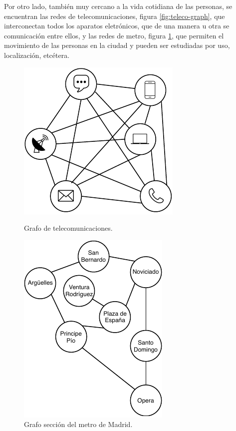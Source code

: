 Por otro lado, también muy cercano a la vida cotidiana de las personas, se encuentran las redes de telecomunicaciones, figura \ref{fig:teleco-graph}, que interconectan todos los aparatos eletrónicos, que de una manera u otra se comunicación entre ellos, y las redes de metro, figura \ref{fig:metro-graph}, que permiten el movimiento de las personas en la ciudad y pueden ser estudiadas por uso, localización, etcétera.

\begin{figure}[H]
	\begin{minipage}[b]{0.5\linewidth}
			\centering
			\includegraphics{Figures/teleco-graph.pdf}
			\caption{Grafo de telecomunicaciones.}
			\label{fig:teleco-graph}
	\end{minipage}
	\hspace{0.5cm}
	\begin{minipage}[b]{0.5\linewidth}
		\centering
		\includegraphics{Figures/metro-graph.pdf}
		\caption{Grafo sección del metro de Madrid.}
		\label{fig:metro-graph}
	\end{minipage}
\end{figure}

